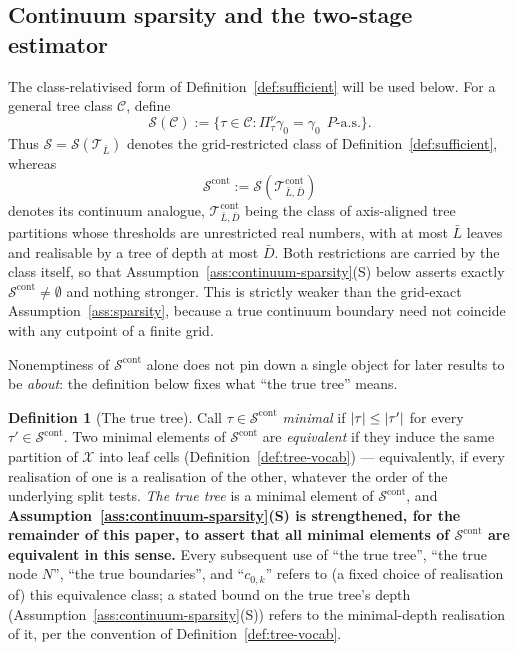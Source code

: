 \documentclass[11pt]{article}
\theoremstyle{plain}
\theoremstyle{definition}
\newtheorem{definition}[theorem]{Definition}
\theoremstyle{remark}
\newcommand{\cX}{\mathcal{X}}
\newcommand{\cT}{\mathcal{T}}
\newcommand{\cS}{\mathcal{S}}
\newcommand{\cC}{\mathcal{C}}
\DeclarePairedDelimiter{\card}{\lvert}{\rvert}
\newcommand{\cTcont}{\cT^{\mathrm{cont}}_{\bar L,\bar D}}
\begin{document}
\subsection{Continuum sparsity and the two-stage estimator}
\label{sec:setup-twostage}

The class-relativised form of Definition~\ref{def:sufficient} will be used
below. For a general tree class $\cC$, define
\[
  \cS(\cC)
  :=
  \bigl\{\tau\in\cC:
  \Pi^\nu_\tau\gamma_0=\gamma_0\ \ P\text{-a.s.}\bigr\}.
\]
Thus $\cS=\cS(\cT_{\bar L})$ denotes the grid-restricted class of
Definition~\ref{def:sufficient}, whereas
\[
  \cS^{\mathrm{cont}}
  :=
  \cS(\cTcont)
\]
denotes its continuum analogue, $\cTcont$ being the class of axis-aligned tree
partitions whose thresholds are unrestricted real numbers, with at most
$\bar L$ leaves and realisable by a tree of depth at most $\bar D$. Both
restrictions are carried by the class itself, so that
Assumption~\ref{ass:continuum-sparsity}(S) below asserts exactly
$\cS^{\mathrm{cont}}\ne\emptyset$ and nothing stronger. This is strictly
weaker than the grid-exact Assumption~\ref{ass:sparsity}, because a true
continuum boundary need not coincide with any cutpoint of a finite grid.

Nonemptiness of $\cS^{\mathrm{cont}}$ alone does not pin down a single object
for later results to be \emph{about}: the definition below fixes what ``the
true tree'' means.

\begin{definition}[The true tree]\label{def:true-tree}
Call $\tau\in\cS^{\mathrm{cont}}$ \emph{minimal} if
$\card\tau\le\card{\tau'}$ for every $\tau'\in\cS^{\mathrm{cont}}$. Two
minimal elements of $\cS^{\mathrm{cont}}$ are \emph{equivalent} if they
induce the same partition of $\cX$ into leaf cells
(Definition~\ref{def:tree-vocab}) --- equivalently, if every realisation of
one is a realisation of the other, whatever the order of the underlying
split tests. \emph{The true tree} is a minimal element of
$\cS^{\mathrm{cont}}$, and \textbf{Assumption~\ref{ass:continuum-sparsity}(S)
is strengthened, for the remainder of this paper, to assert that all minimal
elements of $\cS^{\mathrm{cont}}$ are equivalent in this sense.} Every
subsequent use of ``the true tree'', ``the true node $N$'', ``the true
boundaries'', and ``$c_{0,k}$'' refers to (a fixed choice of realisation of)
this equivalence class; a stated bound on the true tree's depth
(Assumption~\ref{ass:continuum-sparsity}(S)) refers to the minimal-depth
realisation of it, per the convention of Definition~\ref{def:tree-vocab}.
\end{definition}
\end{document}
